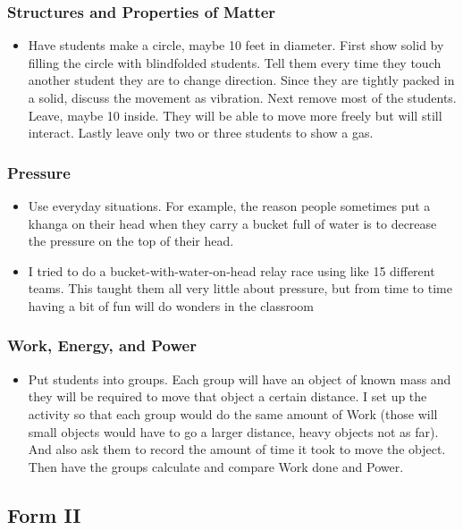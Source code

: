 \subsubsection{Structures and Properties of Matter}
\begin{itemize}
\item	Have students make a circle, maybe 10 feet in diameter. First show solid by filling the circle with blindfolded students. Tell them every time they touch another student they are to change direction. Since they are tightly packed in a solid, discuss the movement as vibration. Next remove most of the students. Leave, maybe 10 inside. They will be able to move more freely but will still interact. Lastly leave only two or three students to show a gas.  
\end{itemize}

\subsubsection{Pressure}
\begin{itemize}
\item	Use everyday situations. For example, the reason people sometimes put a khanga on their head when they carry a bucket full of water is to decrease the pressure on the top of their head. 
\item	I tried to do a bucket-with-water-on-head relay race using like 15 different teams. This taught them all very little about pressure, but from time to time having a bit of fun will do wonders in the classroom
\end{itemize}

\subsubsection{Work, Energy, and Power}
\begin{itemize}
\item	Put students into groups. Each group will have an object of known mass and they will be required to move that object a certain distance. I set up the activity so that each group would do the same amount of Work (those will small objects would have to go a larger distance, heavy objects not as far). And also ask them to record the amount of time it took to move the object. Then have the groups calculate and compare Work done and Power. 
\end{itemize}

\subsection{Form II}

